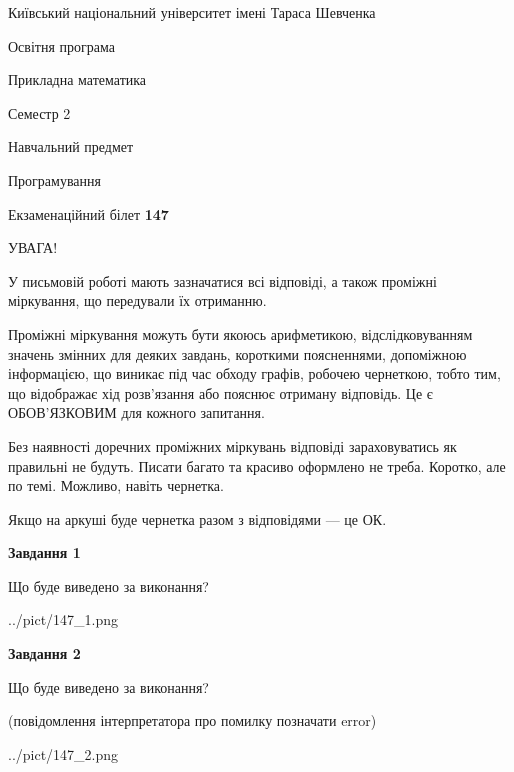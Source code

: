 \documentclass[12pt, ukrainian]{article}
\begin{document}
{{\begin {small}\par
{ \center  Київський національний університет імені Тараса Шевченка \par}
{\parbox {5 cm}{Освітня програма \hfill}{\parbox {7 cm}{Прикладна математика\hfill}}\parbox {6 cm}{\hfill Семестр 2}}\par
{\parbox {5 cm} {Навчальний предмет \hfill}\parbox {7 cm}{Програмування \hfill}\parbox {6cm}{\hfill}\par}\vspace{-7pt} \end{small}}{\center Екзаменаційний білет \No \textbf
{ 147 }\par}}
{
\begin {large}
УВАГА!

У письмовій роботі мають зазначатися всі відповіді, а також проміжні міркування, що передували їх отриманню.

Проміжні міркування можуть бути якоюсь арифметикою, відслідковуванням зна\-чень змінних для деяких завдань,
короткими поясненнями, допоміжною інформацією, що виникає під час обходу графів, робочею чернеткою,
тобто тим, що відображає хід розв’язання або пояснює отриману відповідь.
Це є ОБОВ’ЯЗКОВИМ для кожного запитання.

Без наявності доречних проміжних міркувань відповіді зараховуватись як правиль\-ні не будуть.
Писати багато та красиво оформлено не треба. Коротко, але по темі. Можли\-во, навіть чернетка.

Якщо на аркуші буде чернетка разом з відповідями --- це ОК.

\newpage

{\begin {center}\textbf{Завдання 1}\end {center}}\par
Що буде виведено за виконання?\par
\begin{center}
	{../pict/147_1.png}
\end{center}
\newpage

{\begin {center}\textbf{Завдання 2}\end {center}}\par
Що буде виведено за виконання?\par
 (повідомлення інтерпретатора про помилку позначати error)\par
\begin{center}
	{../pict/147_2.png}
\end{center}
\newpage


\end{large}}
\end{document}

